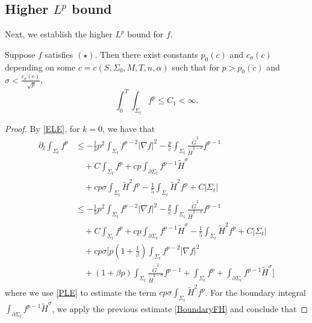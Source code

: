 \subsection{Higher $L^p$ bound}
Next, we establish the higher $L^p$ bound for $f$.

\begin{lemma} \label{hlp}
    Suppose $f$ satisfies $(\star)$. Then there exist constants $p_0(c)$ and $c_\sigma (c)$ depending on some $c=c(S, \Sigma_0,M,T,n,\alpha )$ such that for $p>p_0(c)$ and $\sigma < \frac{c_{\sigma }(c)}{\sqrt[]{p}}$,
    \[\int_{0}^{T}\int_{\Sigma_t} f^p \leq C_1 <\infty .\]  
\end{lemma}

\begin{proof}
    By \autoref{ELE}, for $k=0$, we have that
    \begin{equation*}
    \begin{split}
        \partial_t \int_{\Sigma_t} f^p
        &\leq   -\frac{1}{3}p^2 \int_{\Sigma_t} f^{p-2}\left| \nabla f \right| ^2   -\frac{p}{c} \int_{\Sigma_t} \frac{\tilde{G}^2}{\tilde{H}^{2-\sigma }}f^{p-1}\\
        &\quad +C \int_{\Sigma_t} f^p+cp\int_{\partial \Sigma_t} f^{p-1}\tilde{H}^{\sigma }\\
        &\quad +cp \sigma \int_{\Sigma_t}^{}\tilde{H}^2f^p-\frac{1}{5}\int_{\Sigma_t} \tilde{H}^2f^{p}+C \left| \Sigma_t \right| \\
        &\leq   -\frac{1}{3}p^2 \int_{\Sigma_t} f^{p-2}\left| \nabla f \right| ^2   -\frac{p}{c} \int_{\Sigma_t} \frac{\tilde{G}^2}{\tilde{H}^{2-\sigma }}f^{p-1}\\
        &\quad +C \int_{\Sigma_t} f^p+cp\int_{\partial \Sigma_t} f^{p-1}\tilde{H}^{\sigma } -\frac{1}{5}\int_{\Sigma_t} \tilde{H}^2f^{p}+C \left| \Sigma_t \right| \\
        &\quad +cp \sigma [ p \left( 1+\frac{1}{\beta } \right) \int_{\Sigma_t} f^{p-2}\left| \nabla f \right| ^2   \\
        &\quad +\left( 1+\beta p \right) \int_{\Sigma_t} \frac{\tilde{G}^2}{\tilde{H}^{2-\sigma }}f^{p-1} +\int_{\Sigma_t} f^p+\int_{\partial \Sigma_t} f^{p-1}\tilde{H}^{\sigma } ] 
    \end{split}
    \end{equation*} 
    where we use \autoref{PLE} to estimate the term $cp \sigma \int_{\Sigma_t}^{}\tilde{H}^2f^p$.
    For the boundary integral $\int_{\partial \Sigma_t} f^{p-1}\tilde{H}^{\sigma }$, we apply the previous estimate \autoref{BoundaryFH} and conclude that 

\end{proof}
